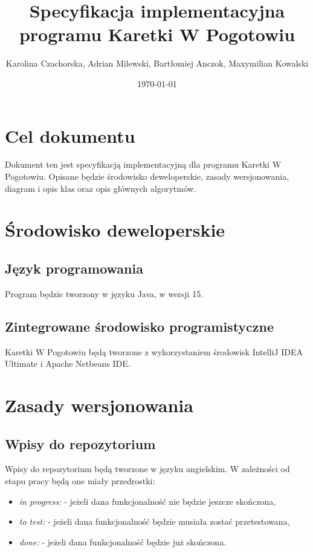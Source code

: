 \documentclass{article}
\title{Specyfikacja implementacyjna programu Karetki W Pogotowiu}
\author{Karolina Czachorska, Adrian Milewski, Bartłomiej Anczok, Maxymilian Kowalski}
\date{\today}
\begin{document}
\maketitle

\tableofcontents
\newpage

\section{Cel dokumentu}
Dokument ten jest specyfikacją implementacyjną dla programu Karetki W Pogotowiu. Opisane będzie środowisko deweloperskie, zasady wersjonowania, diagram i opis klas oraz opis głównych algorytmów.\\
\section{Środowisko deweloperskie}
\subsection{Język programowania}
Program będzie tworzony w języku Java, w wersji 15.\\
\subsection{Zintegrowane środowisko programistyczne}
Karetki W Pogotowiu będą tworzone z wykorzystaniem środowisk IntelliJ IDEA Ultimate i Apache Netbeans IDE.\\
\section{Zasady wersjonowania}
\subsection{Wpisy do repozytorium}
Wpisy do repozytorium będą tworzone w języku angielskim. W zależności od etapu pracy będą one miały przedrostki:\\
\begin{itemize}
\item \textit{in progress:} - jeżeli dana funkcjonalność nie będzie jeszcze skończona,
\item \textit{to test:} - jeżeli dana funkcjonalność będzie musiała zostać przetestowana,
\item \textit{done:} - jeżeli dana funkcjonalność będzie już skończona.
\end{itemize}
\end{document}
